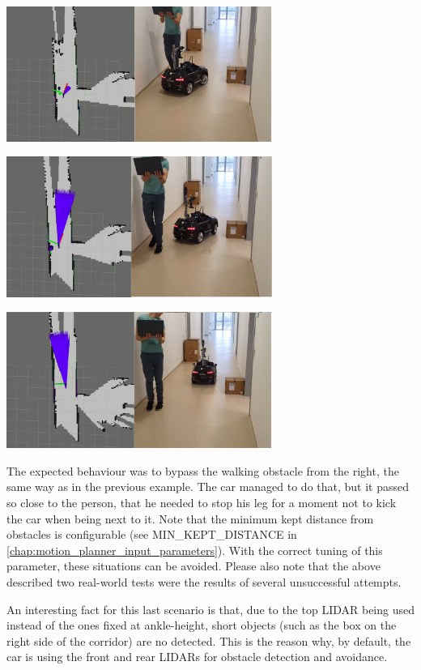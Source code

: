 \begin{center}
	\vspace{0.5cm}
	\includegraphics[width=0.65\textwidth]{figures/raw/local_planner_real_test_joined_straight_traj_1_dynamic_obj_4.png}
	
	\vspace{0.5cm}
	\includegraphics[width=0.65\textwidth]{figures/raw/local_planner_real_test_joined_straight_traj_1_dynamic_obj_5.png}
	
	\vspace{0.5cm}
	\includegraphics[width=0.65\textwidth]{figures/raw/local_planner_real_test_joined_straight_traj_1_dynamic_obj_6.png}
	
	\label{local_planner_real_test_joined_straight_traj_1_dynamic_obj}
\end{center}

The expected behaviour was to bypass the walking obstacle from the right, the same way as in the previous example. The car managed to do that, but it passed so close to the person, that he needed to stop his leg for a moment not to kick the car when being next to it. Note that the minimum kept distance from obstacles is configurable (see MIN\_KEPT\_DISTANCE in \ref{chap:motion_planner_input_parameters}). With the correct tuning of this parameter, these situations can be avoided. Please also note that the above described two real-world tests were the results of several unsuccessful attempts.

An interesting fact for this last scenario is that, due to the top LIDAR being used instead of the ones fixed at ankle-height, short objects (such as the box on the right side of the corridor) are no detected. This is the reason why, by default, the car is using the front and rear LIDARs for obstacle detection and avoidance.